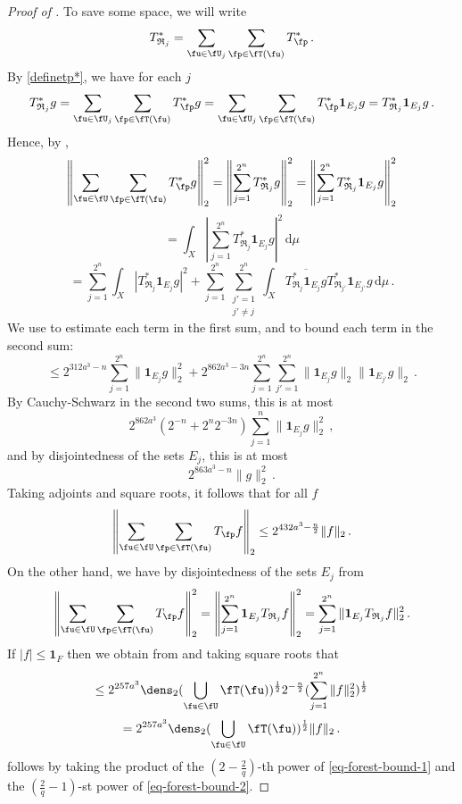 \begin{proof}[Proof of ]
    To save some space, we will write
    $$
        T_{\mathfrak{R}_j}^* = \sum_{\fu \in \fU_j} \sum_{\fp \in \fT(\fu)} T_{\fp}^*\,.
    $$
    By \eqref{definetp*}, we have for each $j$
    $$
        T_{\mathfrak{R}_j}^*g = \sum_{\fu \in \fU_j} \sum_{\fp \in \fT(\fu)} T_{\fp}^* g = \sum_{\fu \in \fU_j} \sum_{\fp \in \fT(\fu)} T_{\fp}^* \mathbf{1}_{E_j} g = T_{\mathfrak{R}_j}^* \mathbf{1}_{E_j} g\,.
    $$
    Hence, by ,
    $$
        \left\|\sum_{\fu \in \fU} \sum_{\fp \in \fT(\fu)} T^*_{\fp} g\right\|_2^2 = \left\|\sum_{j = 1}^{2^n} T^*_{\mathfrak{R}_{j}} g\right\|_2^2 = \left\|\sum_{j=1}^{2^n} T^*_{\mathfrak{R}_{j}} \mathbf{1}_{E_j} g\right\|_2^2
    $$
    $$
        = \int_X \left|\sum_{j=1}^{2^n} T^*_{\mathfrak{R}_{j}} \mathbf{1}_{E_j} g\right|^2 \, \mathrm{d}\mu
    $$
    $$
        = \sum_{j=1}^{2^n} \int_X |T_{\mathfrak{R}_j}^* \mathbf{1}_{E_j} g|^2 + \sum_{j =1}^{2^n} \sum_{\substack{j' = 1\\j' \ne j}}^{2^n} \int_X \overline{ T_{\mathfrak{R}_j}^* \mathbf{1}_{E_j} g} T_{\mathfrak{R}_{j'}}^* \mathbf{1}_{E_{j'}} g \, \mathrm{d}\mu\,.
    $$
    We use  to estimate each term in the first sum, and  to bound each term in the second sum:
    $$
        \le 2^{312a^3-n} \sum_{j = 1}^{2^n} \|\mathbf{1}_{E_j} g\|_2^2 + 2^{862a^3-3 n}\sum_{j=1}^{2^n}\sum_{j' = 1}^{2^n} \|\mathbf{1}_{E_j} g\|_2 \|\mathbf{1}_{E_{j'}}g\|_2\,.
    $$
    By Cauchy-Schwarz in the second two sums, this is at most
    $$
        2^{862a^3} (2^{-n} + 2^{n}2^{-3 n}) \sum_{j = 1}^n \|\mathbf{1}_{E_j} g\|_2^2\,,
    $$
    and by disjointedness of the sets $E_j$, this is at most
    $$
        2^{863a^3 - n} \|g\|_2^2\,.
    $$
    Taking adjoints and square roots, it follows that for all $f$
    \begin{equation}
        \label{eq-forest-bound-1}
        \left\|\sum_{\fu \in \fU} \sum_{\fp \in \fT(\fu)} T_{\fp} f\right\|_2 \le 2^{432a^3-\frac{n}{2}} \|f\|_2\,.
    \end{equation}
    On the other hand, we have by disjointedness of the sets $E_j$
    from 
    $$
        \left\|\sum_{\fu \in \fU} \sum_{\fp \in \fT(\fu)} T_{\fp} f\right\|_2^2 = \left\|\sum_{j=1}^{2^n} \mathbf{1}_{E_j} T_{\mathfrak{R}_{j}} f\right\|_2^2 = \sum_{j = 1}^{2^n} \|\mathbf{1}_{E_j} T_{\mathfrak{R}_{j}} f\|_2^2\,.
    $$
    If $|f| \le \mathbf{1}_F$ then we obtain from  and taking square roots that
    $$
        \le 2^{257a^3} \dens_2(\bigcup_{\fu\in \fU}\fT(\fu))^{\frac{1}{2}} 2^{-\frac{n}{2}} (\sum_{j = 1}^{2^n} \|f\|_2^2)^{\frac{1}{2}}
    $$
    \begin{equation}
        \label{eq-forest-bound-2}
        = 2^{257a^3} \dens_2(\bigcup_{\fu\in \fU}\fT(\fu))^{\frac{1}{2}} \|f\|_2\,.
    \end{equation}
     follows by taking the product of the $(2 - \frac{2}{q})$-th power of \eqref{eq-forest-bound-1} and the $(\frac{2}{q} - 1)$-st power of \eqref{eq-forest-bound-2}.
\end{proof}

